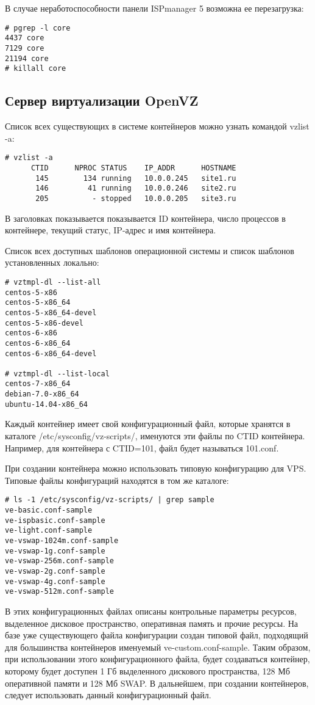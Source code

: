 В случае неработоспособности панели ISPmanager 5 возможна ее перезагрузка:
\begin{lstlisting}
# pgrep -l core
4437 core
7129 core
21194 core
# killall core
\end{lstlisting}

\subsection{Сервер виртуализации OpenVZ}

Список всех существующих в системе контейнеров можно узнать командой vzlist -a:
\begin{lstlisting}
# vzlist -a
      CTID      NPROC STATUS    IP_ADDR      HOSTNAME
       145        134 running   10.0.0.245   site1.ru
       146         41 running   10.0.0.246   site2.ru
       205          - stopped   10.0.0.205   site3.ru
\end{lstlisting}

В заголовках показывается показывается ID контейнера, число процессов в контейнере, текущий статус, IP-адрес и имя контейнера.

Список всех доступных шаблонов операционной системы и список шаблонов установленных локально:
\begin{lstlisting}
# vztmpl-dl --list-all
centos-5-x86
centos-5-x86_64
centos-5-x86_64-devel
centos-5-x86-devel
centos-6-x86
centos-6-x86_64
centos-6-x86_64-devel

# vztmpl-dl --list-local
centos-7-x86_64
debian-7.0-x86_64
ubuntu-14.04-x86_64
\end{lstlisting}

Каждый контейнер имеет свой конфигурационный файл, которые хранятся в каталоге /etc/sysconfig/vz-scripts/, именуются эти файлы по CTID контейнера.
Например, для контейнера с CTID=101, файл будет называться 101.conf.

При создании контейнера можно использовать типовую конфигурацию для VPS.
Типовые файлы конфигураций находятся в том же каталоге:
\begin{lstlisting}
# ls -1 /etc/sysconfig/vz-scripts/ | grep sample
ve-basic.conf-sample
ve-ispbasic.conf-sample
ve-light.conf-sample
ve-vswap-1024m.conf-sample
ve-vswap-1g.conf-sample
ve-vswap-256m.conf-sample
ve-vswap-2g.conf-sample
ve-vswap-4g.conf-sample
ve-vswap-512m.conf-sample
\end{lstlisting}

В этих конфигурационных файлах описаны контрольные параметры ресурсов, выделенное дисковое пространство, оперативная память и прочие ресурсы.
На базе уже существующего файла конфигурации создан типовой файл, подходящий для большинства контейнеров именуемый ve-custom.conf-sample.
Таким образом, при использовании этого конфигурационного файла, будет создаваться контейнер, которому будет доступен 1 Гб выделенного дискового пространства, 128 Мб оперативной памяти и 128 Мб SWAP.
В дальнейшем, при создании контейнеров, следует использовать данный конфигурационный файл.

